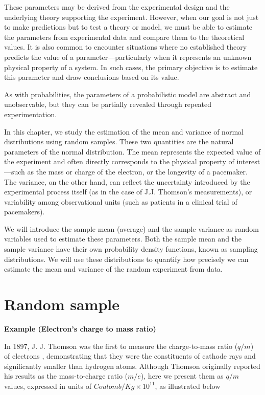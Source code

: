 \documentclass[
]{book}
\begin{document}
These parameters may be derived from the experimental design and the underlying theory supporting the experiment. However, when our goal is not just to make predictions but to test a theory or model, we must be able to estimate the parameters from experimental data and compare them to the theoretical values. It is also common to encounter situations where no established theory predicts the value of a parameter---particularly when it represents an unknown physical property of a system. In such cases, the primary objective is to estimate this parameter and draw conclusions based on its value.

As with probabilities, the parameters of a probabilistic model are abstract and unobservable, but they can be partially revealed through repeated experimentation.

In this chapter, we study the estimation of the mean and variance of normal distributions using random samples. These two quantities are the natural parameters of the normal distribution. The mean represents the expected value of the experiment and often directly corresponds to the physical property of interest---such as the mass or charge of the electron, or the longevity of a pacemaker. The variance, on the other hand, can reflect the uncertainty introduced by the experimental process itself (as in the case of J.J. Thomson's measurements), or variability among observational units (such as patients in a clinical trial of pacemakers).

We will introduce the sample mean (average) and the sample variance as random variables used to estimate these parameters. Both the sample mean and the sample variance have their own probability density functions, known as sampling distributions. We will use these distributions to quantify how precisely we can estimate the mean and variance of the random experiment from data.

\hypertarget{random-sample}{%
\section{Random sample}\label{random-sample}}

\textbf{Example (Electron's charge to mass ratio)}

In 1897, J. J. Thomson was the first to measure the charge-to-mass ratio (\(q/m\)) of electrons \citep{Thomson1897eoverm}, demonstrating that they were the constituents of cathode rays and significantly smaller than hydrogen atoms. Although Thomson originally reported his results as the mass-to-charge ratio (\(m/e\)), here we present them as \(q/m\) values, expressed in units of \(Coulomb/Kg \times 10^{11}\), as illustrated below
\end{document}
